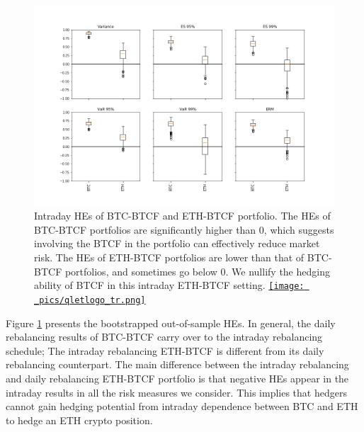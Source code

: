 \documentclass[11pt,a4paper,english]{article}
\providecommand{\natp}[1]{\textcolor{darkorange}{#1}}
\begin{document}

\begin{figure}[t]
\includegraphics[width=\textwidth]{_pics/hourly_HE.png}
  \caption{Intraday HEs of BTC-BTCF and ETH-BTCF portfolio. The HEs of BTC-BTCF portfolios are significantly higher than $0$,
which suggests involving the BTCF in the portfolio can effectively reduce market risk.
The HEs of ETH-BTCF portfolios are lower than that of BTC-BTCF portfolios, and sometimes go below $0$.
We nullify the hedging ability of BTCF in this intraday ETH-BTCF setting.
  \href{http://www.quantlet.com/}{\texttt{[image: \_pics/qletlogo\_tr.png]}} }
\label{fig:HEboxplot_intraday}
\end{figure}

Figure \ref{fig:HEboxplot_intraday} presents the bootstrapped out-of-sample HEs. 
In general, the daily rebalancing results of BTC-BTCF carry over to the intraday rebalancing schedule;
The intraday rebalancing ETH-BTCF is different from its daily rebalancing counterpart.
The main difference between the intraday rebalancing and daily
rebalancing ETH-BTCF portfolio is that negative HEs appear in the
intraday results in all the risk measures we consider. 
This implies that hedgers cannot gain hedging potential from intraday dependence between BTC and ETH to hedge an ETH crypto position. 
\end{document}

